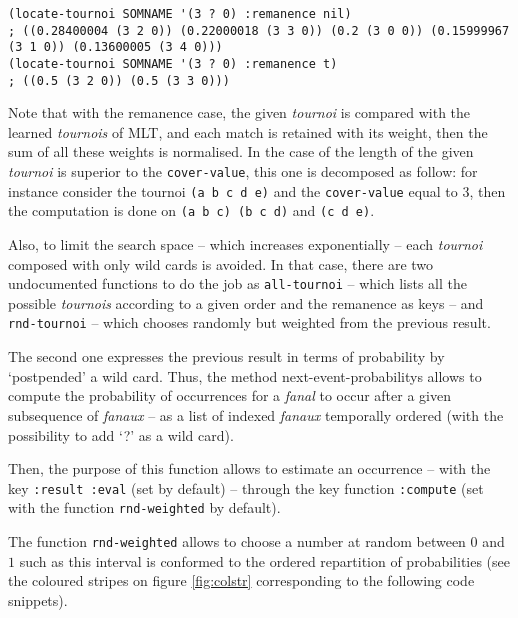 \bigskip
\begin{lstlisting}[language=N3]
(locate-tournoi SOMNAME '(3 ? 0) :remanence nil)
; ((0.28400004 (3 2 0)) (0.22000018 (3 3 0)) (0.2 (3 0 0)) (0.15999967 (3 1 0)) (0.13600005 (3 4 0)))
(locate-tournoi SOMNAME '(3 ? 0) :remanence t)
; ((0.5 (3 2 0)) (0.5 (3 3 0)))
\end{lstlisting}
\bigskip

Note that with the remanence case, the given \textit{tournoi} is compared with the learned \textit{tournois} of MLT, and each match is retained with its weight, then the sum of all these weights is normalised. In the case of the length of the given \textit{tournoi} is superior to the \texttt{cover-value}, this one is decomposed as follow: for instance consider the tournoi \texttt{(a b c d e)} and the \texttt{cover-value} equal to 3, then the computation is done on \texttt{(a b c) (b c d)} and  \texttt{(c d e)}.

\smallskip

Also, to limit the search space -- which increases exponentially -- each \textit{tournoi} composed with only wild cards is avoided. In that case, there are two undocumented functions to do the job as \texttt{all-tournoi} -- which lists all the possible \textit{tournois} according to a given order and the remanence as keys -- and \texttt{rnd-tournoi} -- which chooses randomly but weighted from the previous result.

\bigskip

The second one expresses the previous result in terms of probability by `postpended' a wild card. 
Thus, the method \glspl{next-event-probability} allows to compute the probability of occurrences for a \textit{fanal} to occur after a given subsequence of \textit{fanaux} -- as a list of indexed \textit{fanaux} temporally ordered (with the possibility to add `?' as a wild card).

\smallskip

Then, the purpose of this function allows to estimate an occurrence -- with the key \texttt{:result :eval} (set by default) -- through the key function \texttt{:compute} (set with the function \texttt{rnd-weighted} by default). 

The function \texttt{rnd-weighted} allows to choose a number at random between $0$ and $1$ such as this interval is conformed to the ordered repartition of probabilities (see the coloured stripes on figure \ref{fig:colstr} corresponding to the following code snippets).

\smallskip

